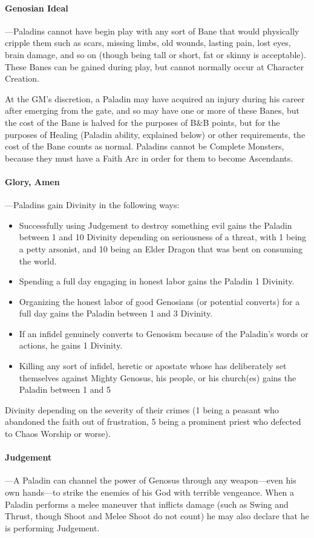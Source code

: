 \documentclass[oneside,11pt,english]{book}
\begin{document}
\paragraph{Genosian Ideal}
---\quad Paladins cannot have begin play with any sort of Bane that would physically cripple them such as 
scars, missing limbs, old wounds, lasting pain, lost eyes, brain damage, and so on (though being 
tall or short, fat or skinny is acceptable). These Banes can be gained during play, but cannot 
normally occur at Character Creation. 

At the GM's discretion, a Paladin may have acquired an 
injury during his career after emerging from the gate, and so may have one or more of these
Banes, but the cost of the Bane is halved for the purposes of B\&B points, but for the purposes of
Healing (Paladin ability, explained below) or other requirements, the cost of the Bane counts as normal.
Paladins cannot be Complete Monsters, because they must have a Faith Arc in order for them to become Ascendants. 
\paragraph{Glory, Amen}
---\quad Paladins gain Divinity in the following ways:
\begin{itemize}
\item Successfully using Judgement to destroy something evil gains the Paladin between 1 and 
10 Divinity depending on seriousness of a threat, with 1 being a petty arsonist, and 10 
being an Elder Dragon that was bent on consuming the world. 
\item Spending a full day engaging in honest labor gains the Paladin 1 Divinity. 
\item Organizing the honest labor of good Genosians (or potential converts) for a full day gains 
the Paladin between 1 and 3 Divinity. 
\item If an infidel genuinely converts to Genosism because of the Paladin's words or actions, he 
gains 1 Divinity. 
\item Killing any sort of infidel, heretic or apostate whose has deliberately set themselves 
against Mighty Genosus, his people, or his church(es) gains the Paladin between 1 and 5 
\end{itemize}
Divinity depending on the severity of their crimes (1 being a peasant who abandoned the faith out of frustration, 5 being a prominent priest who defected to Chaos Worship or worse).
\paragraph{Judgement}
---\quad A Paladin can channel the power of Genosus through any weapon—even his own hands—to strike the enemies of his God with terrible vengeance. When a Paladin performs a melee maneuver that inflicts damage (such as Swing and Thrust, though Shoot and Melee Shoot do not count) he may also declare that he is performing Judgement.\par
\end{document}
